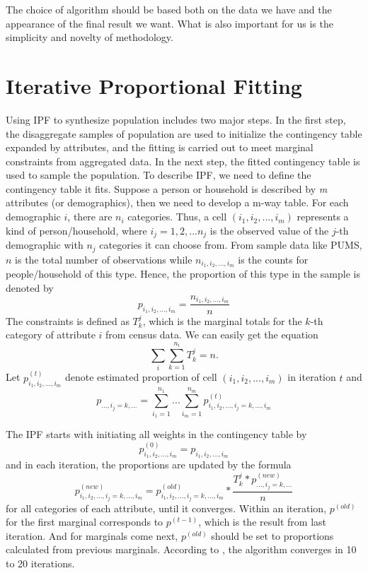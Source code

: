 \documentclass{article}
\begin{document}
The choice of algorithm should be based both on the data we have and the appearance of the final result we want.
What is also important for us is the simplicity and novelty of methodology.


\section{Iterative Proportional Fitting}

Using IPF to synthesize population includes two major steps.
In the first step, the disaggregate samples of population are used to initialize the contingency table expanded by attributes, and the fitting is carried out to meet marginal constraints from aggregated data.
In the next step, the fitted contingency table is used to sample the population.
To describe IPF, we need to define the contingency table it fits.
Suppose a person or household is described by \textit{m} attributes (or demographics), then we need to develop a m-way table.
For each demographic $i$, there are $n_i$ categories.
Thus, a cell $(i_1, i_2,..., i_m)$ represents a kind of person/household, where $i_j = 1,2,...n_j$ is the observed value of the $j$-th demographic with $n_j$ categories it can choose from.
From sample data like PUMS, $n$ is the total number of observations while $n_{i_1, i_2,...,i_m}$ is the counts for people/household of this type.
Hence, the proportion of this type in the sample is denoted by
\begin{equation}
  \label{eqn:prop}
   p_{i_1,i_2,...,i_m} = \frac{n_{i_1, i_2,...,i_m}}{n}
\end{equation}
The constraints is defined as $T_k^j$, which is the marginal totals for the $k$-th category of attribute $i$ from census data.
We can easily get the equation
\begin{equation}
  \label{eq:2}
\sum_i\sum_{k=1}^{n_i}T_k^j=n.  
\end{equation}
Let $p_{i_1,i_2,...,i_m}^{(t)}$ denote estimated proportion of cell $(i_1, i_2,..., i_m)$ in iteration $t$ and
\begin{equation}
  \label{eq:3}
  p_{...,i_j=k,...} = \sum_{i_1=1}^{n_1}...\sum_{i_m=1}^{n_m}p_{i_1,i_2,...,i_j=k,...,i_m}^{(t)}  
\end{equation}

The IPF starts with initiating all weights in the contingency table by  
\begin{equation}
	p_{i_1,i_2,...,i_m}^{(0)} = p_{i_1,i_2,...,i_m}
\end{equation}
and in each iteration, the proportions are updated by the formula
\begin{equation}
  p_{i_1,i_2,...,i_j=k,...,i_m}^{(new)} = p_{i_1,i_2,...,i_j=k,...,i_m}^{(old)} * \frac{T_k^j * p_{...,i_j=k,...}^{(new)}}{n} 
\end{equation} for all categories of each attribute, until it converges.
Within an iteration, $p^{(old)}$ for the first marginal corresponds to $p^{(t-1)}$, which is the result from last iteration.
And for marginals come next, $p^{(old)}$ should be set to proportions calculated from previous marginals.
According to \cite{beckman1996creating}, the algorithm converges in 10 to 20 iterations.
\end{document}
